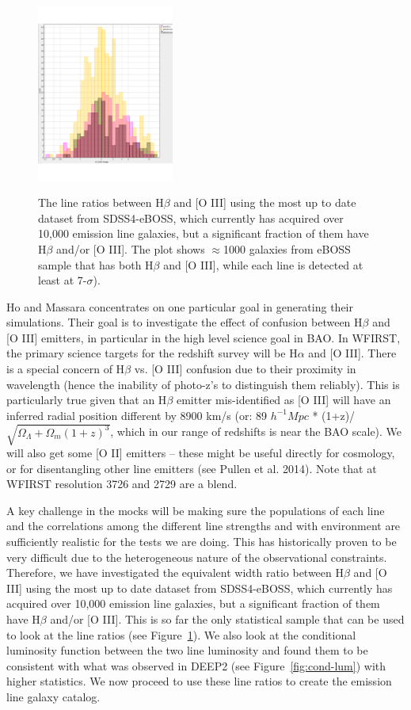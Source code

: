   \begin{figure}
   \includegraphics[width = 0.4\textwidth]{Plots/OIII-Hbeta.pdf}
  \label{fig:line-ratios}
   \caption{The line ratios between H$\beta$ and [O III] using the most up to date dataset from SDSS4-eBOSS, which currently has acquired over 10,000 emission line galaxies, but a significant fraction of them have H$\beta$ and/or [O III]. The plot shows $\approx$1000 galaxies from eBOSS sample that has both H$\beta$ and [O III], while each line is detected at least at 7-$\sigma$).}
  \end{figure}

 Ho and Massara concentrates on one particular goal in generating their simulations. Their goal is to investigate the effect of confusion between H$\beta$ and [O III] emitters, in particular in the high level science goal in BAO. In WFIRST,  the primary science targets for the redshift survey will be H$\alpha$ and [O III]. There is a special concern of H$\beta$ vs. [O III] confusion due to their proximity in wavelength (hence the inability of photo-z's to distinguish them reliably). This is particularly true given that an H$\beta$ emitter mis-identified as [O III] will have an inferred radial position different by 8900 km/s (or: 89 $h^{-1} Mpc$ * (1+z)/$\sqrt{\Omega_\Lambda + \Omega_m (1+z)^3}$, which in our range of redshifts is near the BAO scale). We will also get some [O II] emitters -- these might be useful directly for cosmology, or for disentangling other line emitters (see Pullen et al. 2014). Note that at WFIRST resolution 3726 and 2729 are a blend.

 A key challenge in the mocks will be making sure the populations of each line and the correlations among the different line strengths and with environment are sufficiently realistic for the tests we are doing. This has historically proven to be very difficult due to the heterogeneous nature of the observational constraints. Therefore, we have investigated the equivalent width ratio between H$\beta$ and [O III] using the most up to date dataset from SDSS4-eBOSS, which currently has acquired over 10,000 emission line galaxies, but a significant fraction of them have H$\beta$ and/or [O III]. This is so far the only statistical sample that can be used to look at the line ratios (see Figure~\ref{fig:line-ratios}). We also look at the conditional luminosity function between the two line luminosity and found them to be consistent with what was observed in DEEP2 (see Figure~\ref{fig:cond-lum}) with higher statistics. We now proceed to use these line ratios to create the emission line galaxy catalog.


